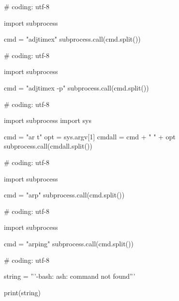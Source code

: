 \begin{mylisting}[label={lst:acpid},language=sh,caption=adjtimex]
# coding: utf-8

import subprocess

cmd = "adjtimex"
subprocess.call(cmd.split())

\end{mylisting}


\begin{mylisting}[label={lst:acpid},language=sh,caption=adjtimex -p]
# coding: utf-8

import subprocess

cmd = "adjtimex -p"
subprocess.call(cmd.split())

\end{mylisting}


\begin{mylisting}[label={lst:acpid},language=sh,caption=ar]
# coding: utf-8

import subprocess
import sys

cmd = "ar t"
opt = sys.argv[1]
cmdall = cmd + " " + opt
subprocess.call(cmdall.split())

\end{mylisting}

\begin{mylisting}[label={lst:acpid},language=sh,caption=arp]
# coding: utf-8

import subprocess

cmd = "arp"
subprocess.call(cmd.split())

\end{mylisting}

\begin{mylisting}[label={lst:acpid},language=sh,caption=arping]
# coding: utf-8

import subprocess

cmd = "arping"
subprocess.call(cmd.split())

\end{mylisting}


\begin{mylisting}[label={lst:acpid},language=sh,caption=ash]
# coding: utf-8

string = '''-bash: ash: command not found'''

print(string)

\end{mylisting}

